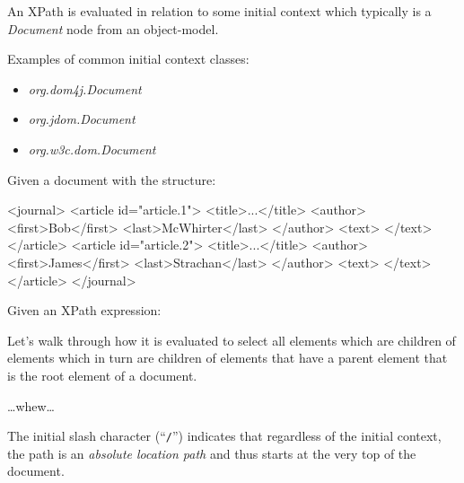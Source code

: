 \documentclass[20pt,landscape,headrule,footrule]{foils}
\begin{document}
An XPath is evaluated in relation to some initial context which typically is a
\emph{Document} node from an object-model.

Examples of common initial context classes:

\begin{minipage}{\textwidth}
\small
\begin{itemize}
  \item \emph{org.dom4j.Document}
  \item \emph{org.jdom.Document}
  \item \emph{org.w3c.dom.Document}
\end{itemize}
\end{minipage}


Given a document with the structure:

\begin{codelisting}
<journal>
    <article id="article.1">
        <title>...</title>
        <author>
          <first>Bob</first>
          <last>McWhirter</last>
        </author>
        <text>
        </text>
    </article>
    <article id="article.2">
        <title>...</title>
        <author>
          <first>James</first>
          <last>Strachan</last>
        </author>
        <text>
        </text>
    </article>
</journal>
\end{codelisting}


Given an XPath expression: 


Let's walk through how it is evaluated to select all 
elements which are children of  elements which in
turn are children of  elements that have a parent 
 element that is the root element of a document.

\dots{}whew\dots

The initial slash character (``\texttt{/}'') indicates that regardless
of the initial context, the path is an \emph{absolute location path}
and thus starts at the very top of the document.
\end{document}
